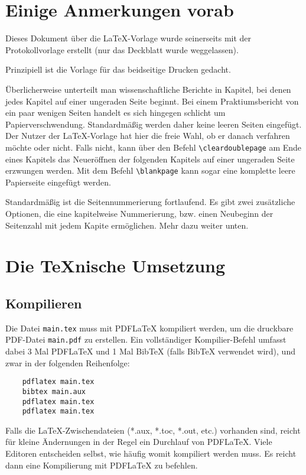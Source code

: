 \section{Einige Anmerkungen vorab}
Dieses Dokument über die LaTeX-Vorlage wurde seinerseits mit der 
Protokollvorlage erstellt (nur das Deckblatt wurde weggelassen).

Prinzipiell ist die Vorlage für das beidseitige Drucken gedacht.

Überlicherweise unterteilt man wissenschaftliche Berichte in Kapitel, bei denen 
jedes Kapitel auf einer ungeraden Seite beginnt. Bei einem Praktiumsbericht von 
ein paar wenigen Seiten handelt es sich hingegen schlicht um 
Papierverschwendung. Standardmäßig werden daher keine leeren Seiten eingefügt. 
Der Nutzer der LaTeX-Vorlage hat hier die freie Wahl, ob er danach verfahren 
möchte oder nicht. Falls nicht, kann über den Befehl \verb|\cleardoublepage| am 
Ende eines Kapitels das Neueröffnen der folgenden Kapitels auf einer ungeraden 
Seite erzwungen werden. Mit dem Befehl \verb|\blankpage| kann sogar eine 
komplette leere Papierseite eingefügt werden.

Standardmäßig ist die Seitennummerierung fortlaufend. Es gibt zwei zusätzliche 
Optionen, die eine kapitelweise Nummerierung, bzw. einen Neubeginn der 
Seitenzahl mit jedem Kapite ermöglichen. Mehr dazu weiter unten.


\section{Die TeXnische Umsetzung}
\subsection{Kompilieren}
Die Datei \verb|main.tex| muss mit PDFLaTeX kompiliert werden, um die druckbare PDF-Datei \verb|main.pdf| zu erstellen. Ein vollständiger Kompilier-Befehl umfasst dabei 3 Mal PDFLaTeX und 1 Mal BibTeX (falls BibTeX verwendet wird), und zwar in der folgenden Reihenfolge:

\begin{verbatim}
	pdflatex main.tex
	bibtex main.aux
	pdflatex main.tex
	pdflatex main.tex
\end{verbatim}

Falls die LaTeX-Zwischendateien (*.aux, *.toc, *.out, etc.) vorhanden sind, 
reicht für kleine Ändernungen in der Regel ein Durchlauf von PDFLaTeX. Viele 
Editoren entscheiden selbst, wie häufig womit kompiliert werden muss. Es reicht 
dann eine Kompilierung mit PDFLaTeX zu befehlen.

